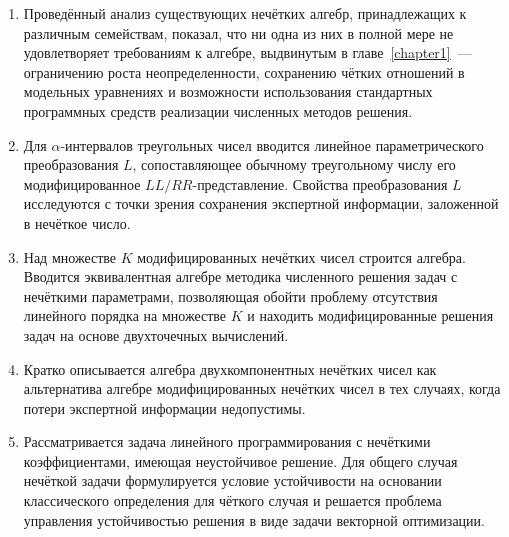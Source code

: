 \begin{enumerate}
  \item Проведённый анализ существующих нечётких алгебр, принадлежащих к различным семействам, показал, что ни одна из них в полной мере не удовлетворяет требованиям к алгебре, выдвинутым в главе~\ref{chapter1}~--- ограничению роста неопределенности, сохранению чётких отношений в модельных уравнениях и возможности использования стандартных программных средств реализации численных методов решения.
  \item Для $\alpha$-интервалов треугольных чисел вводится линейное параметрического преобразования $L$, сопоставляющее обычному треугольному числу его модифицированное $LL/RR$-представление. Свойства преобразования $L$ исследуются с точки зрения сохранения экспертной информации, заложенной в нечёткое число.
  \item Над множестве $K$ модифицированных нечётких чисел строится алгебра. Вводится эквивалентная алгебре методика численного решения задач с нечёткими параметрами, позволяющая обойти проблему отсутствия линейного порядка на множестве $K$ и находить модифицированные решения задач на основе двухточечных вычислений.
  \item Кратко описывается алгебра двухкомпонентных нечётких чисел как альтернатива алгебре модифицированных нечётких чисел в тех случаях, когда потери экспертной информации недопустимы.
  \item Рассматривается задача линейного программирования с нечёткими коэффициентами, имеющая неустойчивое решение. Для общего случая нечёткой задачи формулируется условие устойчивости на основании классического определения для чёткого случая и решается проблема управления устойчивостью решения в виде задачи векторной оптимизации.
\end{enumerate}